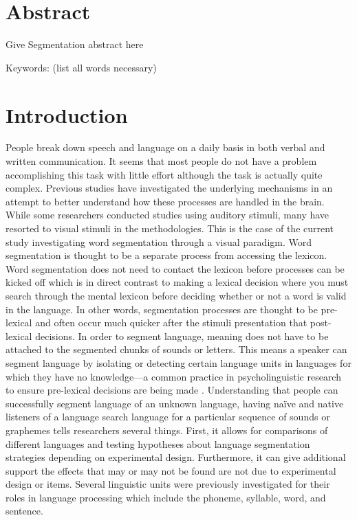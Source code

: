 \documentclass[
12pt, %
english, %
doublespacing, %
nolistspacing, %
liststotoc, %
headsepline, %
chapterinoneline, %
openany, %
]{DoctoralThesis}\usepackage[]{graphicx}\usepackage[]{color}
\begin{document}
\section{Abstract}

Give Segmentation abstract here

Keywords: (list all words necessary)


\section{Introduction}

People break down speech and language on a daily basis in both verbal and written communication. It seems that most people do not have a problem accomplishing this task with little effort although the task is actually quite complex.  Previous studies have investigated the underlying mechanisms in an attempt to better understand how these processes are handled in the brain. While some researchers conducted studies using auditory stimuli, many have resorted to visual stimuli in the methodologies. This is the case of the current study investigating word segmentation through a visual paradigm. Word segmentation is thought to be a separate process from accessing the lexicon. Word segmentation does not need to contact the lexicon before processes can be kicked off which is in direct contrast to making a lexical decision where you must search through the mental lexicon before deciding whether or not a word is valid in the language. In other words, segmentation processes are thought to be pre-lexical and often occur much quicker after the stimuli presentation that post-lexical decisions. In order to segment language, meaning does not have to be attached to the segmented chunks of sounds or letters. This means a speaker can segment language by isolating or detecting certain language units in languages for which they have no knowledge—a common practice in psycholinguistic research to ensure pre-lexical decisions are being made \parencite{Cutler1986-zl}. Understanding that people can successfully segment language of an unknown language, having naïve and native listeners of a language search language for a particular sequence of sounds or graphemes tells researchers several things. First, it allows for comparisons of different languages and testing hypotheses about language segmentation strategies depending on experimental design. Furthermore, it can give additional support the effects that may or may not be found are not due to experimental design or items. Several linguistic units were previously investigated for their roles in language processing which include the phoneme, syllable, word, and sentence. 
\end{document}
